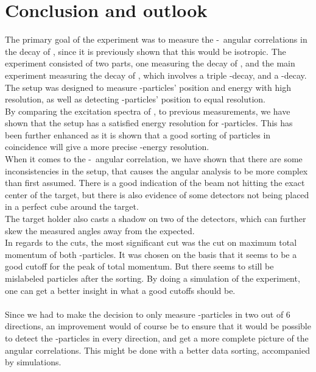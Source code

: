 \chapter{Conclusion and outlook}
The primary goal of the experiment was to measure the \be-\al\ angular correlations in the decay of \li, since it is previously shown that this would be isotropic. 
The experiment consisted of two parts, one measuring the decay of \li, and the main experiment measuring the decay of , which involves a triple \al-decay, and a \be-decay. The setup was designed to measure \al-particles' position and energy with high resolution, as well as detecting \be-particles' position to equal resolution. 
\\
By comparing the excitation spectra of \ber, to previous measurements, we have shown that the setup has a satisfied energy resolution for \al-particles. This has been further enhanced as it is shown that a good sorting of particles in coincidence will give a more precise \al-energy resolution.\\
When it comes to the \be-\al\ angular correlation, we have shown that there are some inconsistencies in the setup, that causes the angular analysis to be more complex than first assumed. There is a good indication of the beam not hitting the exact center of the target, but there is also evidence of some detectors not being placed in a perfect cube around the target. \\
The target holder also casts a shadow on two of the detectors, which can further skew the measured angles away from the expected.\\
In regards to the cuts, the most significant cut was the cut on maximum total momentum of both \al-particles. It was chosen on the basis that it seems to be a good cutoff for the peak of total momentum. But there seems to still be mislabeled particles after the sorting. 
By doing a simulation of the experiment, one can get a better insight in what a good cutoffs should be. \\
\\
Since we had to make the decision to only measure \be-particles in two out of 6 directions, an improvement would of course be to ensure that it would be possible to detect the \be-particles in every direction, and get a more complete picture of the angular correlations. This might be done with a better data sorting, accompanied by simulations. 